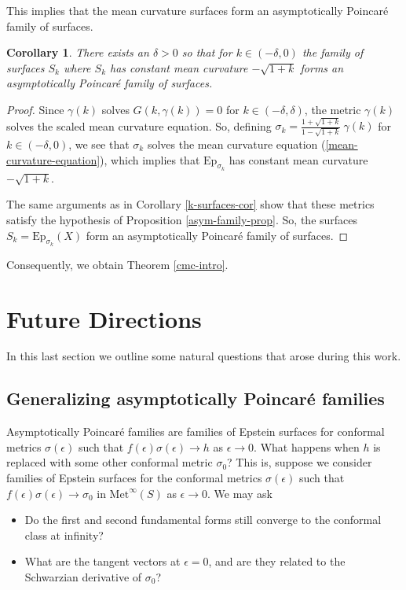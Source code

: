 \documentclass{amsart}
\newtheorem{cor}[thm]{Corollary}
\begin{document}
This implies that the mean curvature surfaces form an asymptotically Poincar\'e family of surfaces. 

\begin{cor}
There exists an $\delta > 0$ so that for $k \in (-\delta, 0)$ the family of surfaces $S_k$ where $S_k$ has constant mean curvature $-\sqrt{1+k}$ forms an asymptotically Poincar\'e family of surfaces. 
\end{cor}

\begin{proof}
Since $\gamma(k)$ solves $G(k,\gamma(k)) = 0$ for $k \in (-\delta,\delta)$, the metric $\gamma(k)$ solves the scaled mean curvature equation. 
So, defining $\sigma_k = \frac{1 + \sqrt{1+k}}{1 - \sqrt{1+k}} \ \gamma(k)$ for $k \in (-\delta,0)$, we see that $\sigma_k$ solves the mean curvature equation (\ref{mean-curvature-equation}), which implies that $\mathrm{Ep}_{\sigma_k}$ has constant mean curvature $-\sqrt{1+k}$.

The same arguments as in Corollary \ref{k-surfaces-cor} show that these metrics satisfy the hypothesis of Proposition \ref{asym-family-prop}.
So, the surfaces $S_k = \mathrm{Ep}_{\sigma_{k}}(X)$ form an asymptotically Poincar\'e family of surfaces. 
\end{proof}

Consequently, we obtain Theorem \ref{cmc-intro}.


\section{Future Directions}


In this last section we outline some natural questions that arose during this work.



\subsection{Generalizing asymptotically Poincar\'e families}



Asymptotically Poincar\'e families are families of Epstein surfaces for conformal metrics $\sigma(\epsilon)$ such that $f(\epsilon)\sigma(\epsilon) \to h$ as $\epsilon \to 0$.
What happens when $h$ is replaced with some other conformal metric $\sigma_0$?
This is, suppose we consider families of Epstein surfaces for the conformal metrics $\sigma(\epsilon)$ such that $f(\epsilon)\sigma(\epsilon) \to \sigma_0$ in $\mathrm{Met}^\infty(S)$ as $\epsilon \to 0$.
We may ask
\begin{itemize}
\item Do the first and second fundamental forms still converge to the conformal class at infinity? 
\item What are the tangent vectors at $\epsilon = 0$, and are they related to the Schwarzian derivative of $\sigma_0$? 
\end{itemize}
\end{document}
